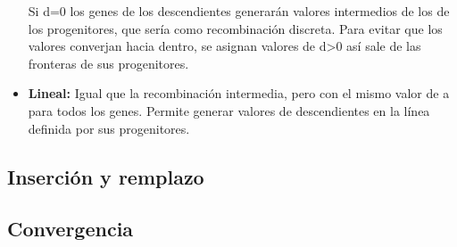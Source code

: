 \documentclass[12pt, twoside, openright]{report} %
\begin{document}
\begin{itemize}
	      Si d=0 los genes de los descendientes generarán valores intermedios de los de los progenitores, que sería como recombinación discreta. Para evitar que los valores converjan hacia dentro, se asignan valores de d>0 así sale de las fronteras de sus progenitores.
	\item \textbf{Lineal:} Igual que la recombinación intermedia, pero con el mismo valor de a para todos los genes. Permite generar valores de descendientes en la línea definida por sus progenitores.
\end{itemize}

\subsection{Inserción y remplazo}
\subsection{Convergencia}
\end{document}
